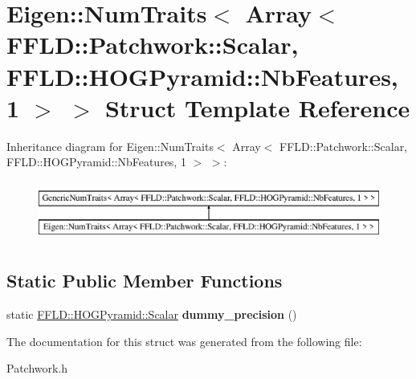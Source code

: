 \hypertarget{struct_eigen_1_1_num_traits_3_01_array_3_01_f_f_l_d_1_1_patchwork_1_1_scalar_00_01_f_f_l_d_1_1_hcd1426a04cfaf6bc4157095debbb74d7}{\section{Eigen\-:\-:Num\-Traits$<$ Array$<$ F\-F\-L\-D\-:\-:Patchwork\-:\-:Scalar, F\-F\-L\-D\-:\-:H\-O\-G\-Pyramid\-:\-:Nb\-Features, 1 $>$ $>$ Struct Template Reference}
\label{struct_eigen_1_1_num_traits_3_01_array_3_01_f_f_l_d_1_1_patchwork_1_1_scalar_00_01_f_f_l_d_1_1_hcd1426a04cfaf6bc4157095debbb74d7}
}
Inheritance diagram for Eigen\-:\-:Num\-Traits$<$ Array$<$ F\-F\-L\-D\-:\-:Patchwork\-:\-:Scalar, F\-F\-L\-D\-:\-:H\-O\-G\-Pyramid\-:\-:Nb\-Features, 1 $>$ $>$\-:\begin{figure}[H]
\begin{center}
\leavevmode
\includegraphics[height=2.000000cm]{struct_eigen_1_1_num_traits_3_01_array_3_01_f_f_l_d_1_1_patchwork_1_1_scalar_00_01_f_f_l_d_1_1_hcd1426a04cfaf6bc4157095debbb74d7}
\end{center}
\end{figure}
\subsection*{Static Public Member Functions}
\begin{DoxyCompactItemize}
\item 
\hypertarget{struct_eigen_1_1_num_traits_3_01_array_3_01_f_f_l_d_1_1_patchwork_1_1_scalar_00_01_f_f_l_d_1_1_hcd1426a04cfaf6bc4157095debbb74d7_a9a62e0bc4289708159eb797b385a1174}{static \hyperlink{class_f_f_l_d_1_1_h_o_g_pyramid_af17c08ed86557e0a0aecb4814daf87c3}{F\-F\-L\-D\-::\-H\-O\-G\-Pyramid\-::\-Scalar} {\bfseries dummy\-\_\-precision} ()}\label{struct_eigen_1_1_num_traits_3_01_array_3_01_f_f_l_d_1_1_patchwork_1_1_scalar_00_01_f_f_l_d_1_1_hcd1426a04cfaf6bc4157095debbb74d7_a9a62e0bc4289708159eb797b385a1174}

\end{DoxyCompactItemize}


The documentation for this struct was generated from the following file\-:\begin{DoxyCompactItemize}
\item 
Patchwork.\-h\end{DoxyCompactItemize}
